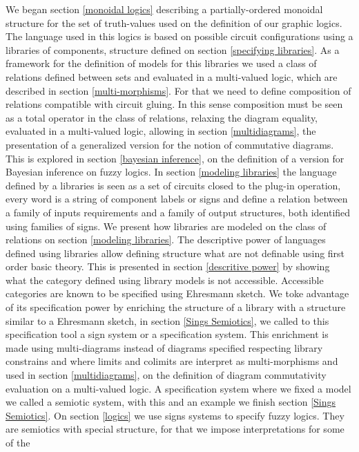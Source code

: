 \documentclass[oribibl]{llncs}
\begin{document}
We began section \ref{monoidal logics} describing a partially-ordered monoidal structure
for the set of truth-values used on the definition of our graphic
logics. The language used in this logics is based on possible
circuit configurations using a libraries of components, structure
defined on section \ref{specifying libraries}. As a framework for the definition of models
for this libraries we used a class of relations defined between sets and evaluated in a multi-valued logic, which are described in
section \ref{multi-morphisms}. For that we need to define composition of relations compatible with circuit gluing. In this sense composition must be seen as a total operator in the class of relations, relaxing the diagram equality, evaluated in a multi-valued logic, allowing in section \ref{multidiagrams}, the presentation of a generalized version for the notion of commutative diagrams. This is explored  in section \ref{bayesian inference}, on the definition of a version for Bayesian inference on fuzzy logics. In
section \ref{modeling libraries} the language defined by a libraries is seen as a set of circuits closed to the plug-in operation, every word is a string of component labels or signs and define a relation
between a family of inputs requirements and a family of output
structures, both identified using families of signs. We present how
libraries are modeled on the class of relations on section \ref{modeling libraries}. The descriptive power of languages defined using libraries allow defining structure what are not definable using first order basic theory. This is presented in section \ref{descritive power} by showing what the category defined using library models is not accessible. Accessible categories are known to be specified using Ehresmann sketch. We toke advantage of its specification power by enriching the structure of a library
with a structure similar to a Ehresmann sketch, in section \ref{Sings Semiotics}, we called to this specification tool a sign system or a
specification system. This enrichment is made using multi-diagrams instead of diagrams specified respecting library constrains and where limits and colimits are interpret as multi-morphisms and used in section \ref{multidiagrams}, on the definition of diagram commutativity evaluation on a multi-valued logic.  A specification system where we fixed a model we called a semiotic system, with this and an example we finish section \ref{Sings Semiotics}. On section \ref{logics} we use
signs systems to specify fuzzy logics. They are semiotics with special structure, for that we impose interpretations for some of the
\end{document}
